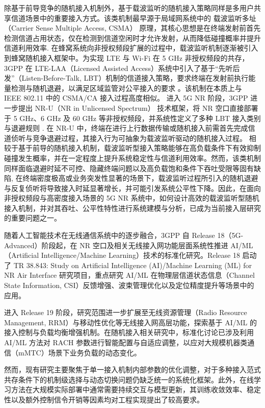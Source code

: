 除基于前导竞争的随机接入机制外，基于载波监听的随机接入策略同样是多用户共享信道场景中的重要接入方式。该类机制最早源于局域网系统中的 载波监听多址（Carrier Sense Multiple Access, CSMA） 原理，其核心思想是在终端发射前首先检测信道占用状态，仅在检测到信道空闲时才允许发射，从而降低碰撞概率并提升信道利用效率\cite{2013_DaiCSMA}. 在蜂窝系统向非授权频段扩展的过程中，载波监听机制逐渐被引入到蜂窝随机接入框架中。为实现 LTE 与 Wi-Fi 在 5 GHz 非授权频段的共存，3GPP 在 LTE-LAA（Licensed Assisted Access）系统中引入了基于“先听后发”（Listen-Before-Talk, LBT）机制的信道接入策略，要求终端在发射前执行能量检测与随机退避，以满足区域监管对公平接入的要求 \cite{2016_LAA}。该机制在本质上与 IEEE 802.11 中的 CSMA/CA 接入过程高度相似。 进入 5G NR 阶段，3GPP 进一步提出 NR-U（NR in Unlicensed Spectrum） 技术框架，将 NR 空口直接部署于 5 GHz、6 GHz 及 60 GHz 等非授权频段，并系统性定义了多种 LBT 接入类别与退避规则 \cite{2024_NRU}. 在 NR-U 中，终端在进行上行数据传输或随机接入前需首先完成信道侦听与竞争退避过程，其接入行为可抽象为载波监听驱动的随机接入过程。 相较于基于前导的随机接入机制，载波监听型接入策略能够在高负载条件下有效抑制碰撞发生概率，并在一定程度上提升系统稳定性与信道利用效率\cite{2013_DaiCSMA}。然而，该类机制同样面临退避时延不可控、隐藏终端问题以及高负载饱和条件下吞吐受限等固有缺陷, 在终端密度极高或业务突发性显著的场景下，载波监听过程所引入的随机退避与反复侦听将导致接入时延显著增长，并可能引发系统公平性下降。因此，在面向非授权频段与高密度接入场景的 5G NR 系统中，如何设计高效的载波监听型随机接入机制，并对其吞吐、公平性特性进行系统建模与分析，已成为当前接入层研究的重要问题之一。


随着人工智能技术在无线通信系统中的逐步融合，3GPP 自 Release 18（5G-Advanced）阶段起，在 NR 空口及相关无线接入网功能层面系统性推进 AI/ML（Artificial Intelligence/Machine Learning）技术的标准化研究。Release 18 启动了 TR 38.843: Study on Artificial Intelligence (AI)/Machine Learning (ML) for NR Air Interface 研究项目，重点研究 AI/ML 在物理层信道状态信息（Channel State Information, CSI）反馈增强、波束管理优化以及定位精度提升等场景中的应用\cite{3GPP_TR38.843}。

进入 Release 19 阶段，研究范围进一步扩展至无线资源管理（Radio Resource Management, RRM）与移动性优化等无线接入网高层功能，探索基于 AI/ML 的接入控制与负载均衡增强机制\cite{3GPP_RP-234039}。在随机接入相关研究中，标准化讨论已涉及利用 AI/ML 方法对 RACH 参数进行智能配置与自适应调整，以应对大规模机器类通信（mMTC）场景下业务负载的动态变化。

然而，现有研究主要聚焦于单一接入机制内部参数的优化调整，对于多种接入范式共存条件下的机制级选择与动态切换问题仍缺乏统一的系统化框架。此外，在线学习方法在大规模实际部署中通常需要持续交互与模型更新，其训练收敛效率、稳定性以及额外控制信令开销等因素均对工程实现提出了较高要求\cite{3GPP_R2-2313456}。


